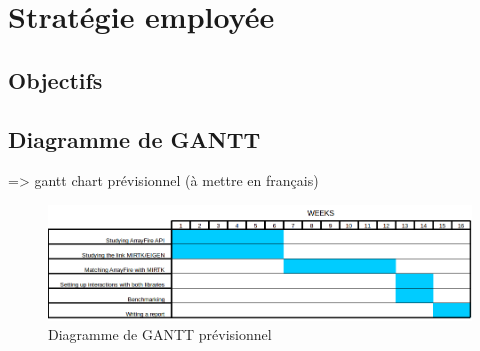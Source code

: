 \documentclass[10pt]{report}
\begin{document}
	\section{Stratégie employée}
	\subsection{Objectifs} 
	\subsection{Diagramme de GANTT}
	 => gantt chart prévisionnel (à mettre en français)
	\begin{figure}[h!]
		\begin{center}
			\includegraphics[width=18cm]{Reports/figures/estimated_gantt.png}
		\end{center}	
		\caption{Diagramme de GANTT prévisionnel}
		\label{Diagramme de GANTT prévisionnel}
	\end{figure}
\end{document}
